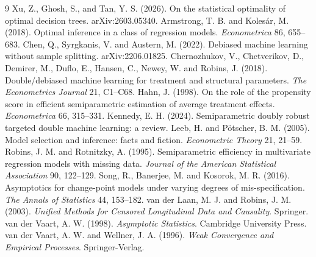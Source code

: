 \documentclass[11pt]{article}
\theoremstyle{plain}
\theoremstyle{definition}
\theoremstyle{remark}
\begin{document}
\begin{thebibliography}{9}
 Xu, Z., Ghosh, S., and Tan, Y. S. (2026).
  On the statistical optimality of optimal decision trees. arXiv:2603.05340.
 Armstrong, T. B. and
  Kolesár, M. (2018). Optimal inference in a class of regression models.
  \emph{Econometrica} 86, 655--683.
 Chen, Q., Syrgkanis, V. and Austern, M.
  (2022). Debiased machine learning without sample splitting.
  arXiv:2206.01825.
 Chernozhukov, V.,
  Chetverikov, D., Demirer, M., Duflo, E., Hansen, C., Newey, W. and Robins, J.
  (2018). Double/debiased machine learning for treatment and structural
  parameters. \emph{The Econometrics Journal} 21, C1--C68.
 Hahn, J. (1998). On the role of the propensity
  score in efficient semiparametric estimation of average treatment effects.
  \emph{Econometrica} 66, 315--331.
 Kennedy, E. H. (2024). Semiparametric
  doubly robust targeted double machine learning: a review.
 Leeb, H. and Pötscher, B. M. (2005).
  Model selection and inference: facts and fiction. \emph{Econometric Theory}
  21, 21--59.
 Robins, J. M. and Rotnitzky, A.
  (1995). Semiparametric efficiency in multivariate regression models with
  missing data. \emph{Journal of the American Statistical Association} 90,
  122--129.
 Song, R., Banerjee, M. and Kosorok, M. R.
  (2016). Asymptotics for change-point models under varying degrees of
  mis-specification. \emph{The Annals of Statistics} 44, 153--182.
 van der Laan, M. J. and
  Robins, J. M. (2003). \emph{Unified Methods for Censored Longitudinal Data
  and Causality}. Springer.
 van der Vaart, A. W. (1998).
  \emph{Asymptotic Statistics}. Cambridge University Press.
 van der
  Vaart, A. W. and Wellner, J. A. (1996). \emph{Weak Convergence and
  Empirical Processes}. Springer-Verlag.

\end{thebibliography}
\end{document}
